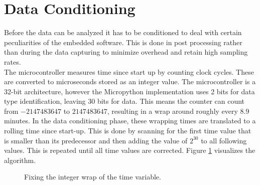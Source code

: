\section{Data Conditioning}

Before the data can be analyzed it has to be conditioned to deal with certain peculiarities of the embedded software. This is done in post processing rather than during the data capturing to minimize overhead and retain high sampling rates.\\

The microcontroller measures time since start up by counting clock cycles. These are converted to microseconds stored as an integer value. The microcontroller is a 32-bit architecture, however the Micropython implementation uses 2 bits for data type identification, leaving 30 bits for data. This means the counter can count from $-2147483647$ to $2147483647$, resulting in a wrap around roughly every $8.9$ minutes. In the data conditioning phase, these wrapping times are translated to a rolling time since start-up. This is done by scanning for the first time value that is smaller than its predecessor and then adding the value of $2^{30}$ to all following values. This is repeated until all time values are corrected. Figure \ref{fig:wrap} visualizes the algorithm.\\

\begin{figure}[H]
	\begin{center}
		\caption{Fixing the integer wrap of the time variable.}
		\label{fig:wrap}
	\end{center}
\end{figure}

